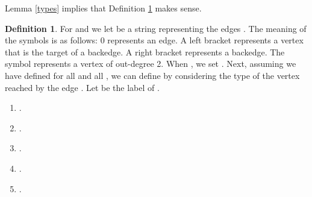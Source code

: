 \documentclass[12pt]{article}
\theoremstyle{plain}
\theoremstyle{definition}
\newtheorem{df}[thm]{Definition}
\theoremstyle{remark}
\begin{document}
			Lemma \ref{types} implies that Definition \ref{def:E} makes sense.
			\begin{df}\label{def:E}
				For  and  we let  be a string representing the edges .
				The meaning of the symbols is as follows: 0 represents an edge.
				A left bracket  represents a vertex that is the target of a backedge.
				A right bracket  represents a backedge.
				The symbol  represents a vertex of out-degree 2.
				When , we set .
				Next, assuming we have defined  for all  and all ,
				we can define  by considering the type of the vertex reached by the edge .
				Let  be the label of .
				\begin{enumerate}
					\item{} .
					\item{} .
					\item{} .
					\item{} .
					\item{} .
				\end{enumerate}
			\end{df}
\end{document}

